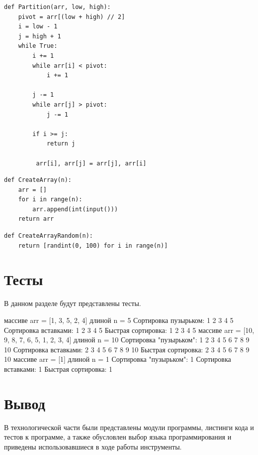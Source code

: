 \documentclass[12pt]{report}
\begin{document}
\begin{lstlisting}[label=some-code,caption=Подпрограмма сравнения элементов с выбранным опорным]
def Partition(arr, low, high): 
    pivot = arr[(low + high) // 2]
    i = low - 1
    j = high + 1
    while True:
        i += 1
        while arr[i] < pivot:
            i += 1

        j -= 1
        while arr[j] > pivot:
            j -= 1

        if i >= j:
            return j

         arr[i], arr[j] = arr[j], arr[i]
\end{lstlisting}

\begin{lstlisting}[label=some-code,caption=Подпрограмма создания массива]
def CreateArray(n):
    arr = []
    for i in range(n):
        arr.append(int(input()))
    return arr

\end{lstlisting}

\begin{lstlisting}[label=some-code,caption=Подпрограмма создания массива с использованием функции randint модуля random  \cite{bib4}]
def CreateArrayRandom(n):
    return [randint(0, 100) for i in range(n)]
\end{lstlisting}

\section{Тесты}

В данном разделе будут представлены тесты.

\begin{enumerate}
	 массиве arr = [1, 3, 5, 2, 4] длиной n = 5
	Сортировка пузырьком: 1 2 3 4 5
	Сортировка вставками: 1 2 3 4 5
	Быстрая сортировка: 1 2 3 4 5
	 массиве arr = [10, 9, 8, 7, 6, 5, 1, 2, 3, 4] длиной n = 10
	Сортировка "пузырьком": 1 2 3 4 5 6 7 8 9 10
	Сортировка вставками:  2 3 4 5 6 7 8 9 10
	Быстрая сортировка:  2 3 4 5 6 7 8 9 10
	 массиве arr = [1] длиной n = 1
	Сортировка "пузырьком": 1
	Сортировка вставками: 1
	Быстрая сортировка: 1 

\end{enumerate}

\section{Вывод}
В технологической части были представлены модули программы, листинги кода и тестов к программе, а также обусловлен выбор языка программирования и приведены использовавшиеся в ходе работы инструменты.
\end{document}
